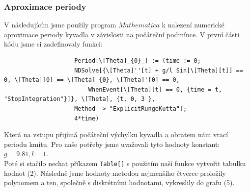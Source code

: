 \documentclass[reqno, a4paper]{amsart}
\begin{document}
				\subsubsection{Aproximace periody}
				\label{sec:aprox-periody}
				V následujícím jsme použily program $Mathematica$ k nalezení numerické aproximace periody kyvadla v závislosti na počáteční podmínce.
				V první části kódu jsme si zadefinovaly funkci:
				\begin{verbatim}
					Period[\[Theta]_{0}_] := (time := 0; 
					NDSolve[{\[Theta]''[t] + g/l Sin[\[Theta][t]] == 0, \[Theta][0] == \[Theta]_{0}, \[Theta]'[0] == 0, 
						WhenEvent[\[Theta][t] == 0, {time = t, "StopIntegration"}]}, \[Theta], {t, 0, 3 },
					Method -> "ExplicitRungeKutta"];
					4*time)
				\end{verbatim}
				Která na vstupu přijímá počáteční výchylku kyvadla a obratem nám vrací periodu kmitu. Pro naše potřeby jsme uvažovali tyto hodnoty konstant: $g=9.81, l=1$.\\
				Poté si stačilo nechat příkazem \verb|Table[]| s použitím naší funkce vytvořit tabulku hodnot (2). Následně jsme hodnoty metodou nejmenšího čtverce proložily polynomem a ten, společně s diskrétními hodnotami, vykreslily do grafu (5).\\
\end{document}
